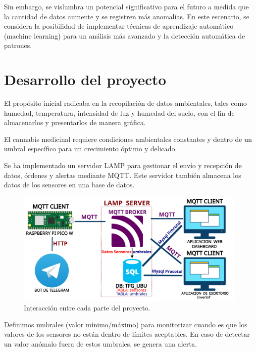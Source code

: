 Sin embargo, se vislumbra un potencial significativo para el futuro a medida que la cantidad de datos aumente y se registren más anomalías. En este escenario, se considera la posibilidad de implementar técnicas de aprendizaje automático (machine learning) para un análisis más avanzado y la detección automática de patrones.

\section{Desarrollo del proyecto}

El propósito inicial radicaba en la recopilación de datos ambientales, tales como humedad, temperatura, intensidad de luz y humedad del suelo, con el fin de almacenarlos y presentarlos de manera gráfica.

El cannabis medicinal requiere condiciones ambientales constantes y dentro de un umbral específico para un crecimiento óptimo y delicado.

Se ha implementado un servidor LAMP para gestionar el envío y recepción de datos, órdenes y alertas mediante MQTT. Este servidor también almacena los datos de los sensores en una base de datos.

\begin{figure}[h]
	\centering
	\includegraphics[width=1\textwidth]{img/diagramas/diagrama_general.png}
	\caption{Interacción entre cada parte del proyecto.} \label{Img:diagrama_general}
\end{figure}

Definimos umbrales (valor mínimo/máximo) para monitorizar cuando es que los valores de los sensores no están dentro de límites aceptables. En caso de detectar un valor anómalo fuera de estos umbrales, se genera una alerta.


